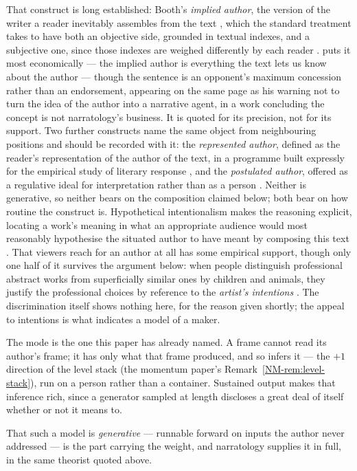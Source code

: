 \documentclass[11pt,a4paper]{article}
\theoremstyle{remark}\newtheorem{remark}[definition]{Remark}
\begin{document}
That construct is long established: Booth's \emph{implied author}, the version of the writer a
reader inevitably assembles from the text \citep{booth1983}, which the standard treatment takes to
have both an objective side, grounded in textual indexes, and a subjective one, since those indexes
are weighed differently by each reader \citep{schmid2014}. \citet{genette1988} puts it most economically ---
the implied author is everything the text lets us know about the author --- though the sentence is an
opponent's maximum concession rather than an endorsement, appearing on the same page as his warning
not to turn the idea of the author into a narrative agent, in a work concluding the concept is not
narratology's business. It is quoted for its precision, not for its support. Two further constructs name the same object from
neighbouring positions and should be recorded with it: the \emph{represented author}, defined as the
reader's representation of the author of the text, in a programme built expressly for the empirical
study of literary response \citep{bortolussi2003}, and the \emph{postulated author}, offered as a
regulative ideal for interpretation rather than as a person \citep{nehamas1981}. Neither is
generative, so neither bears on the composition claimed below; both bear on how routine the construct
is. Hypothetical intentionalism makes the reasoning explicit, locating a work's meaning in what an
appropriate audience would most reasonably hypothesise the situated author to have meant by
composing this text \citep{levinson2002}. That viewers reach for an author at all has some empirical support, though only one half of it
survives the argument below: when people distinguish professional abstract works from superficially
similar ones by children and animals, they justify the professional choices by reference to the
\emph{artist's intentions} \citep{hawleydolan2011}. The discrimination itself shows nothing here,
for the reason given shortly; the appeal to intentions is what indicates a model of a maker.

The mode is the one this paper has already named. A frame cannot read its author's frame; it has
only what that frame produced, and so infers it --- the $+1$ direction of the level stack (the
momentum paper's Remark~\ref{NM-rem:level-stack}), run on a person rather than a container. Sustained output makes that inference rich, since a generator
sampled at length discloses a great deal of itself whether or not it means to.

That such a model is \emph{generative} --- runnable forward on inputs the author never addressed
--- is the part carrying the weight, and narratology supplies it in full, in the same theorist
quoted above.
\end{document}

